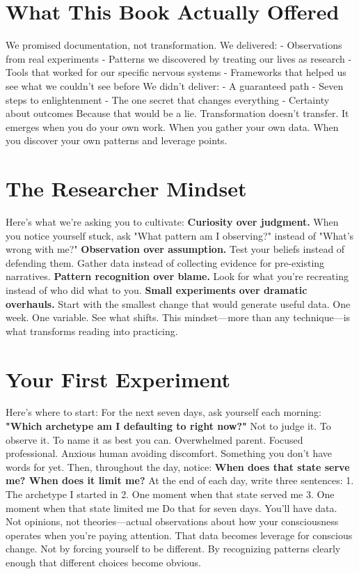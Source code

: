 \section{What This Book Actually Offered}

We promised documentation, not transformation.
We delivered:
- Observations from real experiments
- Patterns we discovered by treating our lives as research
- Tools that worked for our specific nervous systems
- Frameworks that helped us see what we couldn't see before
We didn't deliver:
- A guaranteed path
- Seven steps to enlightenment
- The one secret that changes everything
- Certainty about outcomes
Because that would be a lie.
Transformation doesn't transfer. It emerges when you do your own work. When you gather your own data. When you discover your own patterns and leverage points.

\section{The Researcher Mindset}

Here's what we're asking you to cultivate:
\textbf{Curiosity over judgment.} When you notice yourself stuck, ask "What pattern am I observing?" instead of "What's wrong with me?"
\textbf{Observation over assumption.} Test your beliefs instead of defending them. Gather data instead of collecting evidence for pre-existing narratives.
\textbf{Pattern recognition over blame.} Look for what you're recreating instead of who did what to you.
\textbf{Small experiments over dramatic overhauls.} Start with the smallest change that would generate useful data. One week. One variable. See what shifts.
This mindset—more than any technique—is what transforms reading into practicing.

\section{Your First Experiment}

Here's where to start:
For the next seven days, ask yourself each morning: \textbf{"Which archetype am I defaulting to right now?"}
Not to judge it. To observe it. To name it as best you can.
Overwhelmed parent. Focused professional. Anxious human avoiding discomfort. Something you don't have words for yet.
Then, throughout the day, notice: \textbf{When does that state serve me? When does it limit me?}
At the end of each day, write three sentences:
1. The archetype I started in
2. One moment when that state served me
3. One moment when that state limited me
Do that for seven days.
You'll have data. Not opinions, not theories—actual observations about how your consciousness operates when you're paying attention.
That data becomes leverage for conscious change. Not by forcing yourself to be different. By recognizing patterns clearly enough that different choices become obvious.

